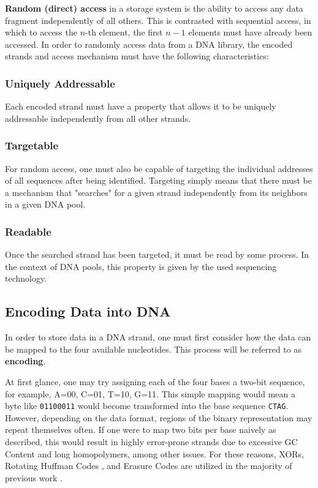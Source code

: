 \documentclass[a4paper,conference]{IEEEtran}
\begin{document}
\textbf{Random (direct) access} in a storage system is the ability to access any data fragment independently of all others. This is contrasted with sequential access, in which to access the $n$-th element, the first $n-1$ elements must have already been accessed. In order to randomly access data from a DNA library, the encoded strands and access mechanism must have the following characteristics:

\subsubsection{Uniquely Addressable}
Each encoded strand must have a property that allows it to be uniquely addressable independently from all other strands.

\subsubsection{Targetable}
For random access, one must also be capable of targeting the individual addresses of all sequences after being identified. Targeting simply means that there must be a mechanism that "searches" for a given strand independently from its neighbors in a given DNA pool.

\subsubsection{Readable}
Once the searched strand has been targeted, it must be read by some process. In the context of DNA pools, this property is given by the used sequencing technology.




\subsection{Encoding Data into DNA}
In order to store data in a DNA strand, one must first consider how the data can be mapped to the four available nucleotides. This process will be referred to as \textbf{encoding}.

At first glance, one may try assigning each of the four bases a two-bit sequence, for example, A=00, C=01, T=10, G=11. This simple mapping would mean a byte like \texttt{01100011} would become transformed into the base sequence \texttt{CTAG}. However, depending on the data format, regions of the binary representation may repeat themselves often. If one were to map two bits per base naively as described, this would result in highly error-prone strands due to excessive GC Content and long homopolymers, among other issues. For these reasons, XORs, Rotating Huffman Codes \cite{huffmancode}, and Erasure Codes \cite{reedsolomon} are utilized in the majority of previous work \cite{dnabasedarchival,pcrbased,pcrbased2,DORIS,chemicalhandles}.
\end{document}
